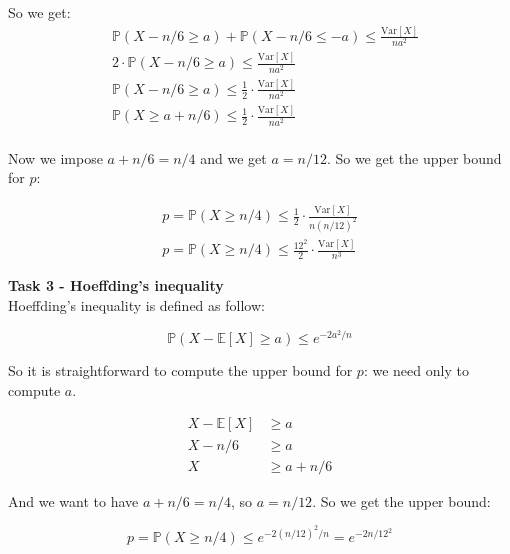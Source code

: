 \documentclass[a4paper,12pt]{article}
\begin{document}
So we get:
\begin{align}
	 & \mathbb{P}(X - n/6 \geq a) + \mathbb{P}(X - n/6 \leq -a) \leq \frac{\text{Var}[X]}{na^2}                   \\
	 & 2 \cdot \mathbb{P}(X - n/6 \geq a)                       \leq \frac{\text{Var}[X]}{na^2}                   \\
	 & \mathbb{P}(X - n/6 \geq a)                               \leq \frac{1}{2} \cdot \frac{\text{Var}[X]}{na^2} \\
	 & \mathbb{P}(X \geq a + n/6)                               \leq \frac{1}{2} \cdot \frac{\text{Var}[X]}{na^2} \\
\end{align}

Now we impose $a + n/6 = n/4$ and we get $a = n / 12$. So we get the upper bound
for $p$:

\begin{align}
	p = \mathbb{P}(X \geq n/4) \leq \frac{1}{2} \cdot \frac{\text{Var}[X]}{n(n/12)^2} \\
	p = \mathbb{P}(X \geq n/4) \leq \frac{12 ^ 2}{2} \cdot \frac{\text{Var}[X]}{n^3}
\end{align}

\vspace{1em}
\noindent\textbf{Task 3 - Hoeffding's inequality}\\

Hoeffding's inequality is defined as follow:

\begin{equation}
	\mathbb{P}(X - \mathbb{E}[X] \geq a) \leq e^{-2a^2/n}
\end{equation}

So it is straightforward to compute the upper bound for $p$: we need only to
compute $a$.

\begin{align}
	X - \mathbb{E}[X] & \geq a       \\
	X - n/6           & \geq a       \\
	X                 & \geq a + n/6
\end{align}

And we want to have $a + n/6 = n/4$, so $a = n/12$. So we get the upper bound:

\begin{equation}
	p = \mathbb{P}(X \geq n/4) \leq e^{-2(n/12)^2/n} = e^{-2n/12^2}
\end{equation}
\end{document}
